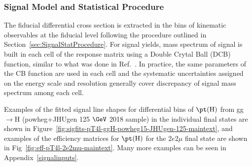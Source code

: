 \subsubsection{Signal Model and Statistical Procedure} \label{sec:SignalDifferential}
The fiducial differential cross section is extracted in the bins of kinematic observables at the fiducial level following the procedure outlined in Section~\ref{sec:SignalStatProcedure}. 
For signal yields, mass spectrum of signal is built in each cell of the response matrix using a Double Crytal Ball (DCB) function, similar to what was done in Ref.~\cite{Chatrchyan:2013mxa}.
In practice, the same parameters of the CB function are used in each cell and the systematic uncertainties assigned on the energy scale and resolution generally cover discrepancy of signal mass spectrum among each cell.
\par
Examples of the fitted signal line shapes for differential bins of $\pt({\rm H})$ from gg$\rightarrow$H ({\sc powheg+JHUgen} 125 $\GeV$ 2018 sample) in the individual
final states are shown in Figure~\ref{fig:sigfits-pT4l-ggH-powheg15-JHUgen-125-maintext}, and examples of the efficiency matrices for $\pt({\rm H})$ for the
$2e2\mu$ final state are shown in Fig~\ref{fig:eff-pT4l-2e2mu-maintext}. Many more examples can be seen in Appendix~\ref{signalinputs}.

